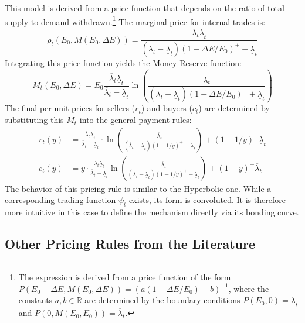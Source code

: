 \documentclass[12pt, notitlepage]{article}
\begin{document}

    
This model is derived from a price function that depends on the ratio of total supply to demand withdrawn.\footnote{The expression is derived from a price function of the form $P(E_0 - \Delta E, M(E_0,\Delta E)) = \left( a (1 - \Delta E/E_0) + b \right)^{-1}$, where the constants $a,b \in \mathbb{R}$ are determined by the boundary conditions $P(E_0,0) = \underline{\lambda}_t$ and $P(0, M(E_0,E_0)) = \overline{\lambda}_t$.} The marginal price for internal trades is:
\begin{equation*}
\rho_t(E_0, M(E_0,\Delta E)) = \frac{\overline{\lambda}_t \underline{\lambda}_t}{(\overline{\lambda}_t - \underline{\lambda}_t)(1 - \Delta E/E_0)^{+} + \underline{\lambda}_t}
\end{equation*}
Integrating this price function yields the Money Reserve function:
\begin{equation*}
M_t(E_0, \Delta E) =  E_0 \frac{\overline{\lambda}_t \underline{\lambda}_t}{\overline{\lambda}_t - \underline{\lambda}_t} \ln\left( \frac{\overline{\lambda}_t}{(\overline{\lambda}_t - \underline{\lambda}_t)(1 - \Delta E / E_0)^+ + \underline{\lambda}_t} \right)
\end{equation*}
The final per-unit prices for sellers ($r_t$) and buyers ($c_t$) are determined by substituting this $M_t$ into the general payment rules:
\begin{align}
r_t(y) &= \frac{\overline{\lambda}_t \underline{\lambda}_t}{\overline{\lambda}_t - \underline{\lambda}_t} \cdot \ln\left( \frac{\overline{\lambda}_t}{(\overline{\lambda}_t - \underline{\lambda}_t)(1 - 1/y )^+ + \underline{\lambda}_t} \right) + (1 - 1/y )^+ \underline{\lambda}_t \\[12pt]
c_t(y) &= y  \cdot \frac{\overline{\lambda}_t \underline{\lambda}_t}{\overline{\lambda}_t - \underline{\lambda}_t} \ln\left( \frac{\overline{\lambda}_t}{(\overline{\lambda}_t - \underline{\lambda}_t)(1 - 1/y)^+ + \underline{\lambda}_t} \right) + (1 - y)^+ \overline{\lambda}_t
\end{align}
The behavior of this pricing rule is similar to the Hyperbolic one. While a corresponding trading function $\psi_t$ exists, its form is convoluted. It is therefore more intuitive in this case to define the mechanism directly via its bonding curve.
\subsection{Other Pricing Rules from the Literature}
\end{document}
